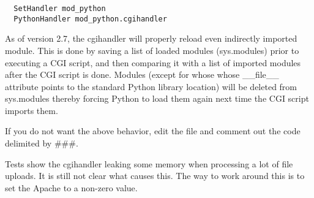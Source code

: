 \begin{verbatim}
  SetHandler mod_python
  PythonHandler mod_python.cgihandler
\end{verbatim}

As of version 2.7, the cgihandler will properly reload even indirectly
imported module. This is done by saving a list of loaded modules
(sys.modules) prior to executing a CGI script, and then comparing it
with a list of imported modules after the CGI script is done.  Modules
(except for whose whose __file__ attribute points to the standard
Python library location) will be deleted from sys.modules thereby
forcing Python to load them again next time the CGI script imports
them.

If you do not want the above behavior, edit the 
file and comment out the code delimited by \#\#\#.

Tests show the cgihandler leaking some memory when processing a lot of
file uploads. It is still not clear what causes this. The way to work
around this is to set the Apache  to a non-zero
value.



